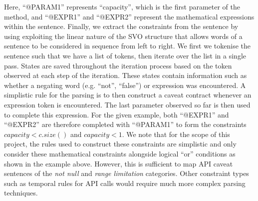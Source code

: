 Here, ``@PARAM1'' represents ``capacity'', which is the first parameter of the method, and ``@EXPR1'' and ``@EXPR2'' represent the mathematical expressions within the sentence. Finally, we extract the constraints from the sentence by using exploiting the linear nature of the SVO structure that allows words of a sentence to be considered in sequence from left to right. We first we tokenise the sentence such that we have a list of tokens, then iterate over the list in a single pass. States are saved throughout the iteration process based on the token observed at each step of the iteration. These states contain information such as whether a negating word (e.g. ``not'', ``false'') or expression was encountered. A simplistic rule for the parsing is to then construct a caveat contract whenever an expression token is encountered. The last parameter observed so far is then used to complete this expression. For the given example, both ``@EXPR1'' and ``@EXPR2'' are therefore completed with ``@PARAM1'' to form the constraints $capacity<c.size()$ and $capacity<1$. We note that for the scope of this project, the rules used to construct these constraints are simplistic and only consider these mathematical constraints alongside logical ``or'' conditions as shown in the example above. However, this is sufficient to map API caveat sentences of the \textit{not null} and \textit{range limitation} categories.  Other constraint types such as temporal rules for API calls would require much more complex parsing techniques.

